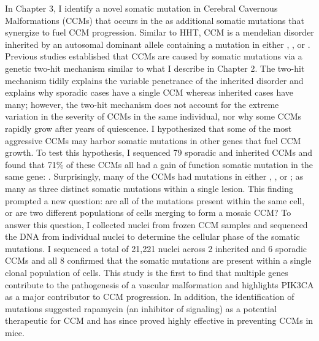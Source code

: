 In Chapter 3, I identify a novel somatic mutation in Cerebral Cavernous Malformations (CCMs) that occurs in the  as additional somatic mutations that synergize to fuel CCM progression. Similar to HHT, CCM is a mendelian disorder inherited by an autosomal dominant allele containing a mutation in either , , or . Previous studies established that CCMs are caused by somatic mutations via a genetic two-hit mechanism similar to what I describe in Chapter 2. The two-hit mechanism tidily explains the variable penetrance of the inherited disorder and explains why sporadic cases have a single CCM whereas inherited cases have many; however, the two-hit mechanism does not account for the extreme variation in the severity of CCMs in the same individual, nor why some CCMs rapidly grow after years of quiescence. I hypothesized that some of the most aggressive CCMs may harbor somatic mutations in other genes that fuel CCM growth. To test this hypothesis, I sequenced 79 sporadic and inherited CCMs and found that 71\% of these CCMs all had a gain of function somatic mutation in the same gene: . Surprisingly, many of the CCMs had mutations in   either , , or ; as many as three distinct somatic mutations within a single lesion. This finding prompted a new question: are all of the mutations present within the same cell, or are two different populations of cells merging to form a mosaic CCM? To answer this question, I collected nuclei from frozen CCM samples and sequenced the DNA from individual nuclei to determine the cellular phase of the somatic mutations. I sequenced a total of 21,221 nuclei across 2 inherited and 6 sporadic CCMs and all 8 confirmed that the somatic mutations are present within a single clonal population of cells. This study is the first to find that multiple genes contribute to the pathogenesis of a vascular malformation and highlights PIK3CA as a major contributor to CCM progression. In addition, the identification of  mutations suggested rapamycin (an inhibitor of  signaling) as a potential therapeutic for CCM and has since proved highly effective in preventing CCMs in mice. 

